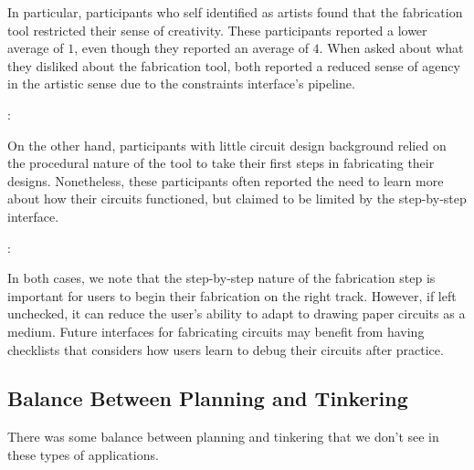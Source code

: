 \documentclass{sigchi}
\begin{document}
  In particular, participants who self identified as artists found that the fabrication tool restricted their sense of creativity. These participants reported a lower average  of $1$, even though they reported an average  of $4$. When asked about what they disliked about the fabrication tool, both reported a reduced sense of agency in the artistic sense due to the constraints interface's pipeline.

  \begin{myquote}
   \vspace{-2pt}
    :
    \vspace{-2pt}
  \end{myquote}

  On the other hand, participants with little circuit design background relied on the procedural nature of the tool to take their first steps in fabricating their designs. Nonetheless, these participants often reported the need to learn more about how their circuits functioned, but claimed to be limited by the step-by-step interface.
  
  \begin{myquote}
   \vspace{-2pt}
    :
    \vspace{-2pt}
  \end{myquote}
  
  In both cases, we note that the step-by-step nature of the fabrication step is important for users to begin their fabrication on the right track. However, if left unchecked, it can reduce the user's ability to adapt to drawing paper circuits as a medium. Future interfaces for fabricating circuits may benefit from having checklists that considers how users learn to debug their circuits after practice.

  \subsection{Balance Between Planning and Tinkering}
  There was some balance between planning and tinkering that we don't see in these types of applications.
  
\end{document}
